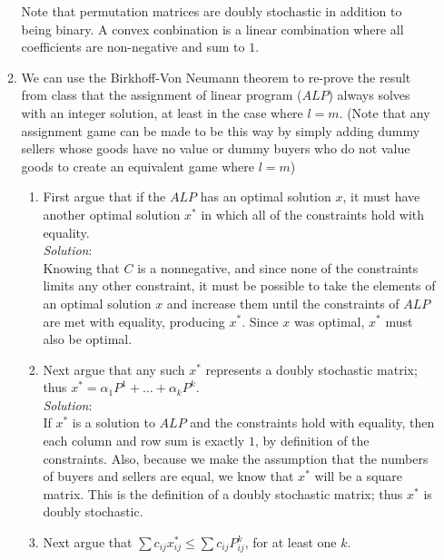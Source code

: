\documentclass{article}
\begin{document}
\begin{enumerate}
\begin{enumerate}
    Note that permutation matrices are doubly stochastic in addition to being binary. A convex conbination is a linear combination where all coefficients are non-negative and sum to $1$. \\

    \item We can use the Birkhoff-Von Neumann theorem to re-prove the result from class that the assignment of linear program ($ALP$) always solves with an integer solution, at least in the case where $l = m$. (Note that any assignment game can be made to be this way by simply adding dummy sellers whose goods have no value or dummy buyers who do not value goods to create an equivalent game where $l = m$)

        \begin{enumerate}
        \item First argue that if the $ALP$ has an optimal solution $x$, it must have another optimal solution $x^{*}$ in which all of the constraints hold with equality. \\

        \textit{Solution}: \\

        Knowing that $C$ is a nonnegative, and since none of the constraints limits any other constraint, it must be possible to take the elements of an optimal solution $x$ and increase them until the constraints of $ALP$ are met with equality, producing $x^{*}$. Since $x$ was optimal, $x^{*}$ must also be optimal. \\

        \item Next argue that any such $x^{*}$ represents a doubly stochastic matrix; thus $x^{*} = \alpha_{1}P^{1} + \dots + \alpha_{k}P^{k}$. \\

        \textit{Solution}: \\

        If $x^{*}$ is a solution to $ALP$ and the constraints hold with equality, then each column and row sum is exactly $1$, by definition of the constraints. Also, because we make the assumption that the numbers of buyers and sellers are equal, we know that $x^{*}$ will be a square matrix. This is the definition of a doubly stochastic matrix; thus $x^{*}$ is doubly stochastic. \\

        \item Next argue that $\sum{c_{ij}x_{ij}^{*}} \le \sum{c_{ij}P_{ij}^{k}}$, for at least one $k$. \\


\end{enumerate}
\end{enumerate}
\end{enumerate}
\end{document}
